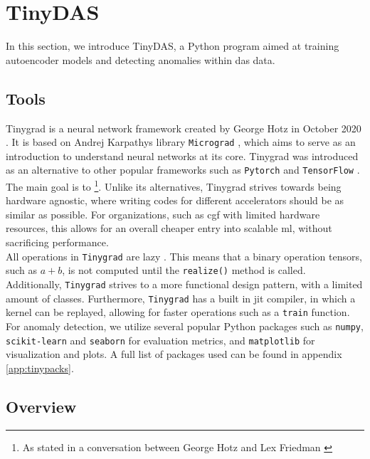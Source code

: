 \section{TinyDAS}

In this section, we introduce TinyDAS, a Python program aimed at training autoencoder models and detecting anomalies within \acrshort{das} data. 

\subsection{Tools}

Tinygrad is a neural network framework created by George Hotz in October 2020 \cite{tinygrad2020}. It is based on Andrej Karpathys library \texttt{Micrograd} \cite{micrograd}, which aims to serve as an introduction to understand neural networks at its core. Tinygrad was introduced as an alternative to other popular frameworks such as \texttt{Pytorch} \cite{paszke2019pytorch} and \texttt{TensorFlow} \cite{abadi2016tensorflow}. The main goal is to  \footnote{As stated in a conversation between George Hotz and Lex Friedman \cite{LexClipsYouTube2023}}. Unlike its alternatives, Tinygrad strives towards being hardware agnostic, where writing codes for different accelerators should be as similar as possible. For organizations, such as \acrshort{cgf} with limited hardware resources, this allows for an overall cheaper entry into scalable \acrshort{ml}, without sacrificing performance. \\

All operations in \texttt{Tinygrad} are lazy \cite{tinygrad}. This means that a binary operation tensors, such as $a+b$, is not computed until the \texttt{realize()} method is called. Additionally, \texttt{Tinygrad} strives to a more functional design pattern, with a limited amount of classes. Furthermore, \texttt{Tinygrad} has a built in \acrfull{jit} compiler, in which a kernel can be replayed, allowing for faster operations such as a \texttt{train} function. \\

For anomaly detection, we utilize several popular Python packages such as \texttt{numpy}, \texttt{scikit-learn} and \texttt{seaborn} for evaluation metrics, and \texttt{matplotlib} for visualization and plots. A full list of packages used can be found in 
appendix \ref{app:tinypacks}.


\subsection{Overview}
\label{meth:tinyoverview}

